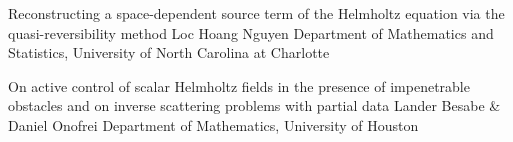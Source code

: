 \begin{talks}
%
\item\talk
{Reconstructing a space-dependent source term of the Helmholtz equation via the quasi-reversibility method}
{Loc Hoang Nguyen}
{Department of Mathematics and Statistics, University of North Carolina at Charlotte}
%
%
\item\talk
{On active control of scalar Helmholtz fields in the presence of impenetrable obstacles and on inverse scattering problems with partial data}
{Lander Besabe \& Daniel Onofrei}
{Department of Mathematics, University of Houston}
\end{talks}
\room

